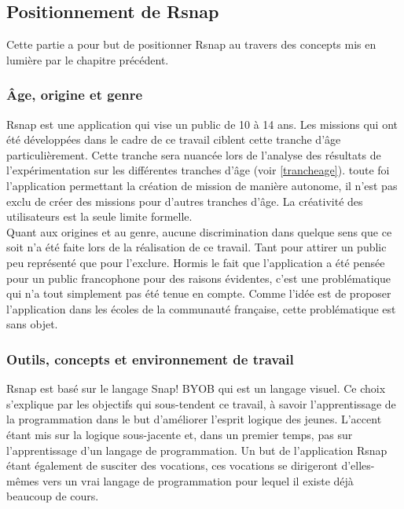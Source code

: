 ﻿\subsection{Positionnement de \gls{Rsnap}}
Cette partie a pour but de positionner \gls{Rsnap} au travers des concepts mis en lumière par le chapitre précédent.

\subsubsection{Âge, origine et genre}
\gls{Rsnap} est une application qui vise un public de 10 à 14 ans. Les missions qui ont été développées dans le cadre de ce travail ciblent cette tranche d'âge particulièrement. Cette tranche sera nuancée lors de l'analyse des résultats de l'expérimentation sur les différentes tranches d'âge (voir \ref{trancheage}). %
toute foi l'application permettant la création de mission de manière autonome, il n'est pas exclu de créer des missions pour d'autres tranches d'âge. La créativité des utilisateurs est la seule limite formelle.\\

Quant aux origines et au genre, aucune discrimination dans quelque sens que ce soit n'a été faite lors de la réalisation de ce travail. Tant pour attirer un public peu représenté que pour l'exclure. Hormis le fait que l'application a été pensée pour un public francophone pour des raisons évidentes, c'est une problématique qui n'a tout simplement pas été tenue en compte. Comme l'idée est de proposer l'application dans les écoles de la communauté française, cette problématique est sans objet.

\subsubsection{Outils, concepts et environnement de travail}
\gls{Rsnap} est basé sur le langage Snap! BYOB qui est un langage visuel. Ce choix s'explique par les objectifs qui sous-tendent ce travail, à savoir l'apprentissage de la programmation dans le but d'améliorer l'esprit logique des jeunes. L'accent étant mis sur la logique sous-jacente et, dans un premier temps, pas sur l'apprentissage d'un langage de programmation. Un but de l'application \gls{Rsnap} étant également de susciter des vocations, ces vocations se dirigeront d'elles-mêmes vers un vrai langage de programmation pour lequel il existe déjà beaucoup de cours.

